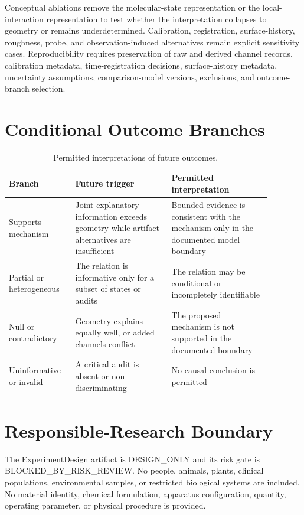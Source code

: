 \documentclass[11pt]{article}
\begin{document}
Conceptual ablations remove the molecular-state representation or the local-interaction representation to test whether the interpretation collapses to geometry or remains underdetermined. Calibration, registration, surface-history, roughness, probe, and observation-induced alternatives remain explicit sensitivity cases. Reproducibility requires preservation of raw and derived channel records, calibration metadata, time-registration decisions, surface-history metadata, uncertainty assumptions, comparison-model versions, exclusions, and outcome-branch selection.

\section{Conditional Outcome Branches}
\begin{table}[htbp]
\centering
\caption{Permitted interpretations of future outcomes.}
\label{tab:outcomes}
\begin{tabular}{p{0.21\linewidth}p{0.33\linewidth}p{0.34\linewidth}}
\toprule
Branch & Future trigger & Permitted interpretation \\
\midrule
Supports mechanism & Joint explanatory information exceeds geometry while artifact alternatives are insufficient & Bounded evidence is consistent with the mechanism only in the documented model boundary \\
Partial or heterogeneous & The relation is informative only for a subset of states or audits & The relation may be conditional or incompletely identifiable \\
Null or contradictory & Geometry explains equally well, or added channels conflict & The proposed mechanism is not supported in the documented boundary \\
Uninformative or invalid & A critical audit is absent or non-discriminating & No causal conclusion is permitted \\
\bottomrule
\end{tabular}
\end{table}

\section{Responsible-Research Boundary}
The ExperimentDesign artifact is DESIGN\_ONLY and its risk gate is BLOCKED\_BY\_RISK\_REVIEW. No people, animals, plants, clinical populations, environmental samples, or restricted biological systems are included. No material identity, chemical formulation, apparatus configuration, quantity, operating parameter, or physical procedure is provided.
\end{document}
